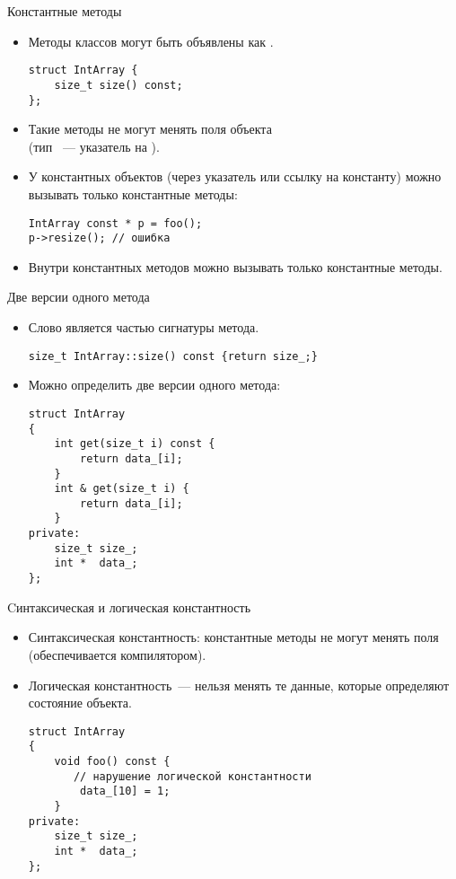 \documentclass{beamer}
\begin{document}
\begin{frame}[fragile]{Константные методы}{}
    \begin{itemize}
        \item Методы классов могут быть объявлены как .
\begin{lstlisting}
struct IntArray {
    size_t size() const;
};
\end{lstlisting}
        \item Такие методы не могут менять поля объекта\\
            (тип ~--- указатель на ).

        \item У константных объектов (через указатель или ссылку на константу)
            можно вызывать только константные методы:

\begin{lstlisting}
IntArray const * p = foo();
p->resize(); // ошибка
\end{lstlisting}
        \item Внутри константных методов можно вызывать только константные методы.

    \end{itemize}
\end{frame}

\begin{frame}[fragile]{Две версии одного метода}{}
    \begin{itemize}
        \item Слово  является частью сигнатуры метода.
\begin{lstlisting}
size_t IntArray::size() const {return size_;}
\end{lstlisting}
        \item Можно определить две версии одного метода:
\begin{lstlisting}
struct IntArray 
{
    int get(size_t i) const { 
        return data_[i]; 
    }
    int & get(size_t i) { 
        return data_[i]; 
    }
private:
    size_t size_;
    int *  data_;
};
\end{lstlisting}

    \end{itemize}
\end{frame}

\begin{frame}[fragile]{Cинтаксическая и логическая константность}{}
\begin{itemize}
    \item Синтаксическая константность: константные методы
        не могут менять поля (обеспечивается компилятором).
    \item Логическая константность~--- нельзя менять те данные, 
        которые определяют состояние объекта.
\begin{lstlisting}
struct IntArray 
{
    void foo() const {
       // нарушение логической константности
        data_[10] = 1; 
    }
private:
    size_t size_;
    int *  data_;
};
\end{lstlisting}
\end{itemize}
    
\end{frame}
\end{document}
